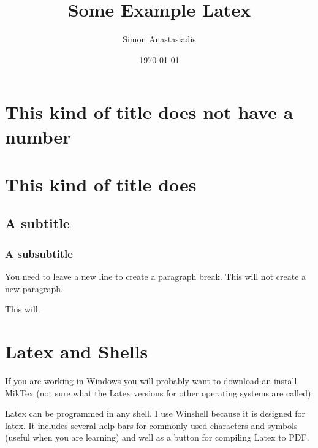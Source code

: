 \documentclass[a4paper,11pt]{article}
\begin{document}
\title{Some Example Latex}
\author{Simon Anastasiadis}
\date{\today}
\maketitle

\section*{This kind of title does not have a number}

\section{This kind of title does}

\subsection{A subtitle}

\subsubsection{A subsubtitle}

You need to leave a new line to create a paragraph break.
This will not create a new paragraph.

This will.


\section{Latex and Shells}

If you are working in Windows you will probably want to download an install MikTex (not sure what the Latex versions for other operating systems are called).

Latex can be programmed in any shell. I use Winshell because it is designed for latex. It includes several help bars for commonly used characters and symbols (useful when you are learning) and well as a button for compiling Latex to PDF.
\end{document}
